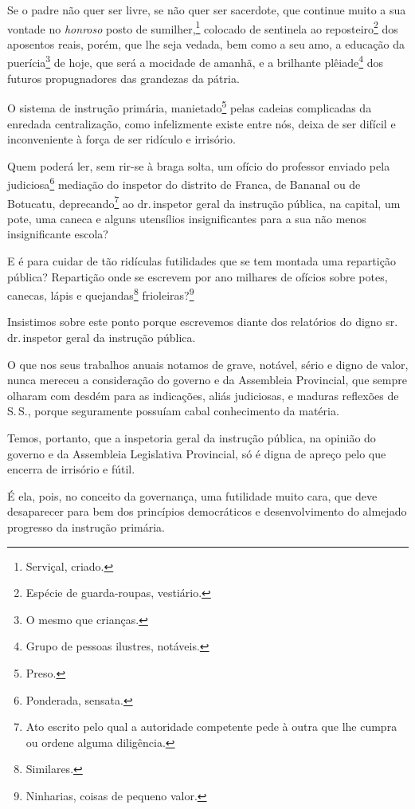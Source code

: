 Se o padre não quer ser livre, se não quer ser sacerdote, que continue
muito a sua vontade no \emph{honroso} posto de sumilher,\footnote{
  Serviçal, criado.} colocado de sentinela ao reposteiro\footnote{
  Espécie de guarda-roupas, vestiário.} dos aposentos reais, porém, que
lhe seja vedada, bem como a seu amo, a educação da puerícia\footnote{O
  mesmo que crianças.} de hoje, que será a mocidade de amanhã, e a
brilhante plêiade\footnote{Grupo de pessoas ilustres, notáveis.} dos
futuros propugnadores das grandezas da pátria.

O sistema de instrução primária, manietado\footnote{Preso.} pelas
cadeias complicadas da enredada centralização, como infelizmente existe
entre nós, deixa de ser difícil e inconveniente à força de ser ridículo
e irrisório.

Quem poderá ler, sem rir-se à braga solta, um ofício do professor
enviado pela judiciosa\footnote{Ponderada, sensata.} mediação do
inspetor do distrito de Franca, de Bananal ou de Botucatu,
deprecando\footnote{Ato escrito pelo qual a autoridade competente pede
  à outra que lhe cumpra ou ordene alguma diligência.} ao dr.\,inspetor
geral da instrução pública, na capital, um pote, uma caneca e alguns
utensílios insignificantes para a sua não menos insignificante escola?

E é para cuidar de tão ridículas futilidades que se tem montada uma
repartição pública? Repartição onde se escrevem por ano milhares de
ofícios sobre potes, canecas, lápis e quejandas\footnote{Similares.}
frioleiras?\footnote{Ninharias, coisas de pequeno valor.}

Insistimos sobre este ponto porque escrevemos diante dos relatórios do
digno sr.\,dr.\,inspetor geral da instrução pública.

O que nos seus trabalhos anuais notamos de grave, notável, sério e digno
de valor, nunca mereceu a consideração do governo e da Assembleia
Provincial, que sempre olharam com desdém para as indicações, aliás
judiciosas, e maduras reflexões de S.\,S., porque seguramente possuíam
cabal conhecimento da matéria.

Temos, portanto, que a inspetoria geral da instrução pública, na opinião
do governo e da Assembleia Legislativa Provincial, só é digna de apreço
pelo que encerra de irrisório e fútil.

É ela, pois, no conceito da governança, uma futilidade muito cara, que
deve desaparecer para bem dos princípios democráticos e desenvolvimento
do almejado progresso da instrução primária.

